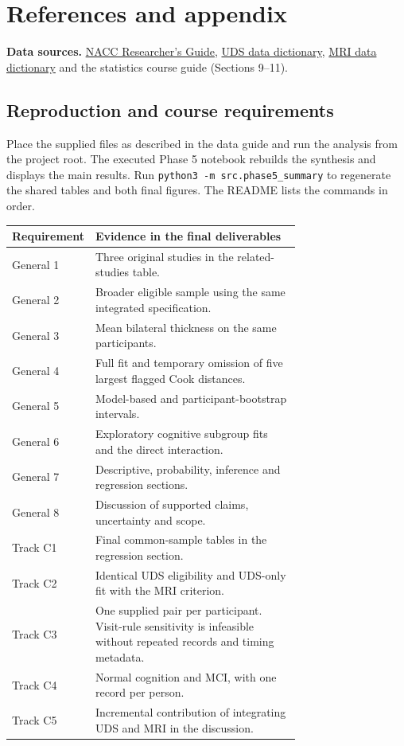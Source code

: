 \documentclass[11pt]{article}
\begin{document}
\clearpage
\section{References and appendix}


\clearpage
\textbf{Data sources.} \href{https://www.naccdata.org/the-nacc-researchers-guide/}{NACC Researcher's Guide}, \href{https://r2d2.kumc.edu/ADC/Protocols/UDS2_protocol/ResearchDataDict_2015Mar.pdf\#page=205}{UDS data dictionary}, \href{https://files.alz.washington.edu/documentation/SCAN-MRI-Imaging-RDD.pdf\#page=17}{MRI data dictionary} and the statistics course guide (Sections 9--11).

\subsection{Reproduction and course requirements}
Place the supplied files as described in the data guide and run the analysis from the project root. The executed Phase 5 notebook rebuilds the synthesis and displays the main results. Run \texttt{python3 -m src.phase5\_summary} to regenerate the shared tables and both final figures. The README lists the commands in order.

\begin{center}\small
\begin{tabular}{@{}lp{0.72\linewidth}@{}}\toprule
Requirement & Evidence in the final deliverables\\
\midrule
General 1 & Three original studies in the related-studies table.\\
General 2 & Broader eligible sample using the same integrated specification.\\
General 3 & Mean bilateral thickness on the same participants.\\
General 4 & Full fit and temporary omission of five largest flagged Cook distances.\\
General 5 & Model-based and participant-bootstrap intervals.\\
General 6 & Exploratory cognitive subgroup fits and the direct interaction.\\
General 7 & Descriptive, probability, inference and regression sections.\\
General 8 & Discussion of supported claims, uncertainty and scope.\\
Track C1 & Final common-sample tables in the regression section.\\
Track C2 & Identical UDS eligibility and UDS-only fit with the MRI criterion.\\
Track C3 & One supplied pair per participant. Visit-rule sensitivity is infeasible without repeated records and timing metadata.\\
Track C4 & Normal cognition and MCI, with one record per person.\\
Track C5 & Incremental contribution of integrating UDS and MRI in the discussion.\\
\bottomrule
\end{tabular}
\end{center}
\end{document}
